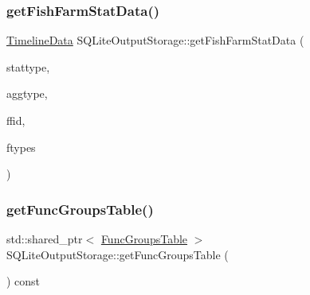 \mbox{\label{class_s_q_lite_output_storage_a9fcb77eceee6c2ba83d5cba617ad652c}} 
\subsubsection{\texorpdfstring{getFishFarmStatData()}{getFishFarmStatData()}}
{\footnotesize\ttfamily \mbox{\hyperlink{struct_timeline_data}{Timeline\+Data}} S\+Q\+Lite\+Output\+Storage\+::get\+Fish\+Farm\+Stat\+Data (\begin{DoxyParamCaption}\item[{\mbox{\hyperlink{namespacedisplace_1_1plot_a4746af73ffe0625cf87b8fb07fd5bfa4}{displace\+::plot\+::\+Fishfarms\+Stat}}}]{stattype,  }\item[{\mbox{\hyperlink{namespacedisplace_1_1plot_a522cdc3da3faefae0803944b866e0c3d}{displace\+::plot\+::\+Aggregation\+Type}}}]{aggtype,  }\item[{int}]{ffid,  }\item[{std\+::vector$<$ int $>$}]{ftypes }\end{DoxyParamCaption})}

\mbox{\label{class_s_q_lite_output_storage_a81a6dd6bdf2e3f23017965853824099a}} 
\subsubsection{\texorpdfstring{getFuncGroupsTable()}{getFuncGroupsTable()}}
{\footnotesize\ttfamily std\+::shared\+\_\+ptr$<$ \mbox{\hyperlink{class_func_groups_table}{Func\+Groups\+Table}} $>$ S\+Q\+Lite\+Output\+Storage\+::get\+Func\+Groups\+Table (\begin{DoxyParamCaption}{ }\end{DoxyParamCaption}) const}

\mbox{\label{class_s_q_lite_output_storage_ac901bca6c4b571781e3f7ced6789e405}} 
